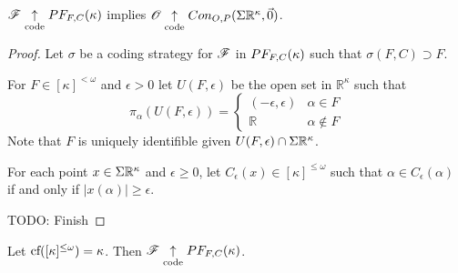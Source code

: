 \begin{thm}
  $\mathscr{F} \underset{\text{code}}{\uparrow} PF_{F,C}(\kappa)$ implies
  $\mathscr{O} \underset{\text{code}}{\uparrow} Con_{O,P}(\Sigma\mathbb{R}^{\kappa},\vec0)$.
\end{thm}

\begin{proof}
  Let $\sigma$ be a coding strategy for $\mathscr{F}$ in $PF_{F,C}(\kappa)$
  such that $\sigma(F,C)\supset F$.

  For $F\in[\kappa]^{<\omega}$ and $\epsilon>0$ let $U(F,\epsilon)$ be the
  open set in $\mathbb{R}^\kappa$ such that
  \[
    \pi_\alpha(U(F,\epsilon)) =
    \left\{
      \begin{array}{ll}
        (-\epsilon,\epsilon) & \alpha\in F\\
        \mathbb{R} & \alpha\not\in F
      \end{array}
    \right.
  \]
  Note that $F$ is uniquely identifible given
  $U(F,\epsilon)\cap\Sigma\mathbb{R}^{\kappa}$.

  For each point $x\in\Sigma\mathbb{R}^{\kappa}$ and $\epsilon\geq 0$, let
  $C_\epsilon(x)\in[\kappa]^{\leq\omega}$
  such that $\alpha\in C_\epsilon(\alpha)$ if and only if
  $|x(\alpha)|\geq\epsilon$.

  TODO: Finish



\end{proof}

\begin{thm}
  Let $\textrm{cf}([\kappa]^{\leq\omega})=\kappa$.
  Then $\mathscr{F} \underset{\text{code}}{\uparrow} PF_{F,C}(\kappa)$.
\end{thm}

